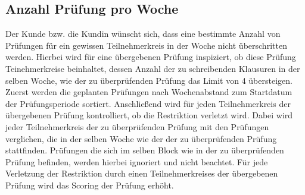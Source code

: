 \subsection{Anzahl Prüfung pro Woche}
Der Kunde bzw. die Kundin wünscht sich,
dass eine bestimmte Anzahl von Prüfungen für ein gewissen Teilnehmerkreis
in der Woche nicht überschritten werden.
Hierbei wird für eine übergebenen Prüfung inspiziert,
ob diese Prüfung Teinehmerkreise beinhaltet, dessen Anzahl der zu schreibenden Klausuren in der selben Woche,
wie der zu überprüfenden Prüfung das Limit von 4 übersteigen.
Zuerst werden die geplanten Prüfungen nach Wochenabstand zum Startdatum der Prüfungsperiode sortiert.
Anschließend wird für jeden Teilnehmerkreis der übergebenen Prüfung kontrolliert,
ob die Restriktion verletzt wird.
Dabei wird jeder Teilnehmerkreis der zu überprüfenden Prüfung mit
den Prüfungen verglichen, die in der selben Woche wie der der zu überprüfenden Prüfung stattfinden.
Prüfungen die sich im selben Block wie in der zu überprüfenden Prüfung befinden,
werden hierbei ignoriert und nicht beachtet.
Für jede Verletzung der Restriktion durch einen Teilnehmerkreises der übergebenen Prüfung wird das Scoring der Prüfung erhöht.



